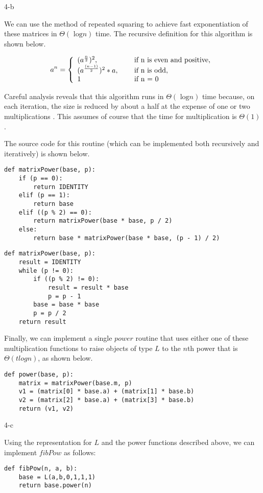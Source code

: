 \documentclass[11pt]{article}
\newcommand{\tlog}{\text{ log}}
\begin{document}
\begin{prob}{4-b}
\end{prob}
\begin{sol}

We can use the method of repeated squaring to achieve fast exponentiation of these matrices in $\Theta(\tlog n)$ time. The recursive definition for this algorithm is shown below.

\[
a^{n} = \left\{ 
  \begin{array}{l l}
    (a^{\frac{n}{2}})^{2}, & \quad \text{ if n is even and positive,} \\
    (a^{\frac{(n-1)}{2}})^{2} * a, & \quad \text{ if n is odd}, \\
   1 & \quad \text{ if n = 0}
  \end{array} \right.
\]

Careful analysis reveals that this algorithm runs in $\Theta(\tlog n)$ time because, on each iteration, the size is reduced by about a half at the expense of one or two multiplications \cite{AlgoBook}. This assumes of course that the time for multiplication is $\Theta(1)$.

The source code for this routine (which can be implemented both recursively and iteratively) is shown below.
\begin{lstlisting}
def matrixPower(base, p):
	if (p == 0):
		return IDENTITY
	elif (p == 1):
		return base
	elif ((p % 2) == 0):
		return matrixPower(base * base, p / 2)
	else:
		return base * matrixPower(base * base, (p - 1) / 2)
\end{lstlisting}

\begin{lstlisting}
def matrixPower(base, p):
	result = IDENTITY
	while (p != 0):
		if ((p % 2) != 0):
			result = result * base
			p = p - 1
		base = base * base
		p = p / 2
	return result
\end{lstlisting}
Finally, we can implement a single $power$ routine that uses either one of these multiplication functions to raise objects of type $L$ to the $n$th power that is $\Theta(tlog n)$, as shown below.
\begin{lstlisting}
def power(base, p):
	matrix = matrixPower(base.m, p)
	v1 = (matrix[0] * base.a) + (matrix[1] * base.b)
	v2 = (matrix[2] * base.a) + (matrix[3] * base.b)
	return (v1, v2)
\end{lstlisting}
\end{sol}

\begin{prob}{4-c}
\end{prob}
\begin{sol}

Using the representation for $L$ and the power functions described above, we can implement $fibPow$ as follows:
\begin{lstlisting}
def fibPow(n, a, b):
	base = L(a,b,0,1,1,1)
	return base.power(n)
\end{lstlisting}
\end{sol}
\end{document}
